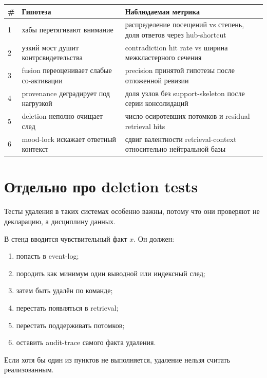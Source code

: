 \begin{center}
\begin{tabular}{p{} p{} p{}}
\toprule
\# & \textbf{Гипотеза} & \textbf{Наблюдаемая метрика} \\
\midrule
1 & хабы перетягивают внимание & распределение посещений vs степень, доля ответов через hub-shortcut \\
2 & узкий мост душит контрсвидетельства & contradiction hit rate vs ширина межкластерного сечения \\
3 & fusion переоценивает слабые со-активации & precision принятой гипотезы после отложенной ревизии \\
4 & provenance деградирует под нагрузкой & доля узлов без support-skeleton после серии консолидаций \\
5 & deletion неполно очищает след & число осиротевших потомков и residual retrieval hits \\
6 & mood-lock искажает ответный контекст & сдвиг валентности retrieval-context относительно нейтральной базы \\
\bottomrule
\end{tabular}
\end{center}

\section{Отдельно про deletion tests}

Тесты удаления в таких системах особенно важны, потому что они проверяют не
декларацию, а дисциплину данных.

\begin{workedbox}
В стенд вводится чувствительный факт $x$. Он должен:
\begin{enumerate}
\item попасть в event-log;
\item породить как минимум один выводной или индексный след;
\item затем быть удалён по команде;
\item перестать появляться в retrieval;
\item перестать поддерживать потомков;
\item оставить audit-trace самого факта удаления.
\end{enumerate}
Если хотя бы один из пунктов не выполняется, удаление нельзя считать реализованным.
\end{workedbox}

